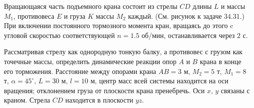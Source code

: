 Вращающаяся часть подъемного крана состоит из стрелы $CD$ длины $L$
и массы $M_1$, противовеса $E$ и груза $K$ массы $M_2$ каждый.
(См. рисунок к задаче 34.31.)
При включении постоянного тормозного момента кран,
вращаясь до этого c угловой скоростью соответствующей $n = 1.5$ об/мин,
останавливается через $2$ с.

Рассматривая стрелу как однородную тонкую балку, а противовес с грузом
как точечные массы, определить динамические реакции опор $A$ и $B$
крана в конце его торможения.
Расстояние между опорами крана $AB = 3$ м, $M_2 = 5$ т, $M_1 = 8$ т,
$\alpha = 45^{\circ}$, $L = 30$ м, $l = 10$ м,
центр масс всей системы находится на оси вращения;
отклонением груза от плоскости крана пренебречь.
Оси $x$, $y$ связаны с краном.
Стрела $CD$ находится в плоскости $yz$.
